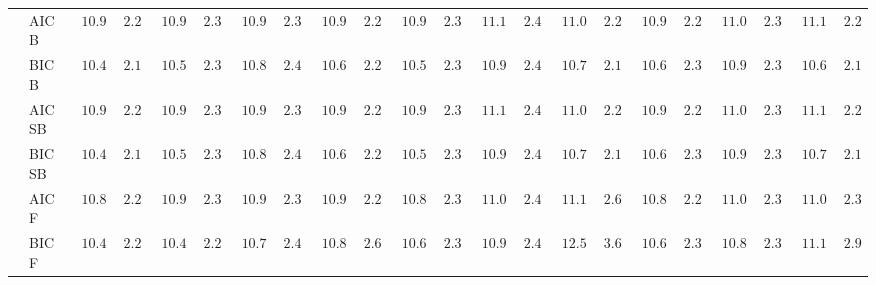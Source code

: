 \begin{tabular}{p{0.2cm}p{1cm}|p{0.6cm}p{0.6cm}|p{0.6cm}p{0.6cm}p{0.6cm}p{0.6cm}p{0.6cm}p{0.6cm}|p{0.6cm}p{0.6cm}p{0.6cm}p{0.6cm}p{0.6cm}p{0.6cm}|p{0.6cm}p{0.6cm}p{0.6cm}p{0.6cm}p{0.6cm}p{0.6cm}}
 & AIC B  & $\phantom{0}10.96$ & $\phantom{0}2.24$ & $\phantom{0}10.99$ & $\phantom{0}2.37$ & $\phantom{0}10.96$ & $\phantom{0}2.30$ & $\phantom{0}10.96$ & $\phantom{0}2.27$ & $\phantom{0}10.91$ & $\phantom{0}2.30$ & $\phantom{0}11.16$ & $\phantom{0}2.49$ & $\phantom{0}11.09$ & $\phantom{0}2.28$ & $\phantom{0}10.97$ & $\phantom{0}2.25$ & $\phantom{0}11.05$ & $\phantom{0}2.39$ & $\phantom{0}11.10$ & $\phantom{0}2.29$ \\
 & BIC B  & $\phantom{0}10.47$ & $\phantom{0}2.19$ & $\phantom{0}10.56$ & $\phantom{0}2.33$ & $\phantom{0}10.81$ & $\phantom{0}2.45$ & $\phantom{0}10.68$ & $\phantom{0}2.26$ & $\phantom{0}10.59$ & $\phantom{0}2.36$ & $\phantom{0}10.95$ & $\phantom{0}2.43$ & $\phantom{0}10.76$ & $\phantom{0}2.19$ & $\phantom{0}10.62$ & $\phantom{0}2.30$ & $\phantom{0}10.92$ & $\phantom{0}2.39$ & $\phantom{0}10.69$ & $\phantom{0}2.15$ \\
 & AIC SB  & $\phantom{0}10.96$ & $\phantom{0}2.24$ & $\phantom{0}10.98$ & $\phantom{0}2.36$ & $\phantom{0}10.96$ & $\phantom{0}2.31$ & $\phantom{0}10.96$ & $\phantom{0}2.27$ & $\phantom{0}10.91$ & $\phantom{0}2.30$ & $\phantom{0}11.16$ & $\phantom{0}2.49$ & $\phantom{0}11.07$ & $\phantom{0}2.25$ & $\phantom{0}10.97$ & $\phantom{0}2.25$ & $\phantom{0}11.07$ & $\phantom{0}2.38$ & $\phantom{0}11.10$ & $\phantom{0}2.29$ \\
 & BIC SB  & $\phantom{0}10.47$ & $\phantom{0}2.19$ & $\phantom{0}10.56$ & $\phantom{0}2.33$ & $\phantom{0}10.81$ & $\phantom{0}2.45$ & $\phantom{0}10.68$ & $\phantom{0}2.26$ & $\phantom{0}10.59$ & $\phantom{0}2.36$ & $\phantom{0}10.92$ & $\phantom{0}2.42$ & $\phantom{0}10.76$ & $\phantom{0}2.19$ & $\phantom{0}10.62$ & $\phantom{0}2.30$ & $\phantom{0}10.92$ & $\phantom{0}2.39$ & $\phantom{0}10.70$ & $\phantom{0}2.17$ \\
 & AIC F  & $\phantom{0}10.88$ & $\phantom{0}2.22$ & $\phantom{0}10.92$ & $\phantom{0}2.34$ & $\phantom{0}10.94$ & $\phantom{0}2.31$ & $\phantom{0}10.90$ & $\phantom{0}2.26$ & $\phantom{0}10.83$ & $\phantom{0}2.34$ & $\phantom{0}11.07$ & $\phantom{0}2.45$ & $\phantom{0}11.15$ & $\phantom{0}2.63$ & $\phantom{0}10.88$ & $\phantom{0}2.24$ & $\phantom{0}11.00$ & $\phantom{0}2.33$ & $\phantom{0}11.00$ & $\phantom{0}2.31$ \\
 & BIC F  & $\phantom{0}10.43$ & $\phantom{0}2.27$ & $\phantom{0}10.49$ & $\phantom{0}2.25$ & $\phantom{0}10.75$ & $\phantom{0}2.47$ & $\phantom{0}10.81$ & $\phantom{0}2.63$ & $\phantom{0}10.61$ & $\phantom{0}2.35$ & $\phantom{0}10.90$ & $\phantom{0}2.41$ & $\phantom{0}12.52$ & $\phantom{0}3.69$ & $\phantom{0}10.62$ & $\phantom{0}2.30$ & $\phantom{0}10.82$ & $\phantom{0}2.31$ & $\phantom{0}11.17$ & $\phantom{0}2.98$ \\

\end{tabular}
